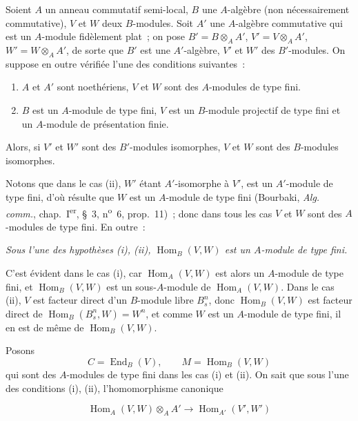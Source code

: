 \begin{proposition}[2.5.8]
\label{IV.2.5.8-fr}
Soient $A$ un anneau commutatif semi-local, $B$ une $A$-algèbre (non
nécessairement commutative), $V$ et $W$ deux $B$-modules. Soit $A'$ une
$A$-algèbre commutative qui est un $A$-module \textup{fidèlement plat}~; on pose $B'=B\otimes_A A'$, $V'=V\otimes_A A'$, $W'=W\otimes_A A'$, de sorte que $B'$ est une $A'$-algèbre, $V'$ et $W'$ des $B'$-modules. On
suppose en outre vérifiée l'une des conditions suivantes~:
\begin{enumerate}
\item[\textup{(i)}] $A$ et $A'$ sont noethériens, $V$ et $W$ sont des $A$-modules de
type fini.
\item[\textup{(ii)}] $B$ est un $A$-module de type fini, $V$ est un $B$-module
projectif de type fini et un $A$-module de présentation finie.
\end{enumerate}
Alors, si $V'$ et $W'$ sont des $B'$-modules isomorphes, $V$ et $W$ sont des
$B$-modules isomorphes.
\end{proposition}

Notons que dans le cas (ii), $W'$ étant $A'$-isomorphe à $V'$, est un
$A'$-module de type fini, d'où résulte que $W$ est un $A$-module de type fini
(Bourbaki, \emph{Alg. comm.}, chap.~I\textsuperscript{er}, \S~3,
n\textsuperscript{o}~6, prop.~11)~; donc dans tous les cas $V$ et $W$ sont
des $A$-modules de type fini. En outre~:

\begin{env}[2.5.8.1]
\label{IV.2.5.8.1-fr}
\itshape Sous l'une des hypothèses \textup{(i), (ii)}, $\operatorname{Hom}_B(V,W)$ est un
$A$-module de type fini.
\end{env}

C'est évident dans le cas (i), car $\operatorname{Hom}_A(V,W)$ est alors un
$A$-module de type fini, et $\operatorname{Hom}_B(V,W)$ est un sous-$A$-module
de $\operatorname{Hom}_A(V,W)$. Dans le cas (ii), $V$ est facteur direct d'un
$B$-module libre $B_s^n$, donc $\operatorname{Hom}_B(V,W)$ est facteur direct de
$\operatorname{Hom}_B(B_s^n,W)=W^n$, et comme $W$ est un $A$-module de type
fini, il en est de même de $\operatorname{Hom}_B(V,W)$.

Posons
\[
C=\operatorname{End}_B(V),\qquad M=\operatorname{Hom}_B(V,W)
\]
qui sont des $A$-modules de type fini dans les cas (i) et (ii). On sait que
sous l'une des conditions (i), (ii), l'homomorphisme canonique

\begin{env}[2.5.8.2]
\label{IV.2.5.8.2-fr}
\[
\operatorname{Hom}_A(V,W)\otimes_A A'\longrightarrow
\operatorname{Hom}_{A'}(V',W')
\]
\end{env}

